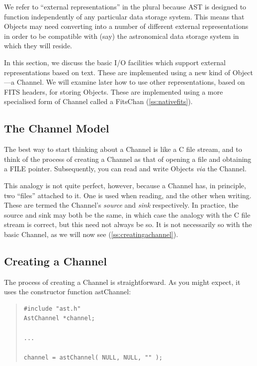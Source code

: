 \documentclass[twoside,11pt]{article}
\newcommand{\htmlref}[2]{#1}
\newcommand{\secref}[1]{\S\ref{#1}}
\renewcommand{\secref}[1]{\ref{#1}}
\begin{document}
We refer to ``external representations'' in the plural because AST is
designed to function independently of any particular data storage
system. This means that Objects may need converting into a number of
different external representations in order to be compatible with
(say) the astronomical data storage system in which they will reside.

In this section, we discuss the basic I/O facilities which support
external representations based on text. These are implemented using a
new kind of Object---a \htmlref{Channel}{Channel}. We will examine later how
to use other representations, based on FITS headers, for storing
Objects. These are implemented using a more specialised form of
Channel called a \htmlref{FitsChan}{FitsChan} (\secref{ss:nativefits}).

\subsection{The Channel Model}

The best way to start thinking about a \htmlref{Channel}{Channel} is like a C file
stream, and to think of the process of creating a Channel as that
of opening a file and obtaining a FILE pointer.  Subsequently, you can
read and write Objects {\em{via}} the Channel.

This analogy is not quite perfect, however, because a Channel has, in
principle, two ``files'' attached to it. One is used when reading, and
the other when writing. These are termed the Channel's {\em{source}}
and {\em{sink}} respectively. In practice, the source and sink may
both be the same, in which case the analogy with the C file stream is
correct, but this need not always be so. It is not necessarily so with
the basic Channel, as we will now see (\secref{ss:creatingachannel}).

\subsection{\label{ss:creatingachannel}Creating a Channel}

The process of creating a \htmlref{Channel}{Channel} is straightforward. As you
might expect, it uses the constructor function \htmlref{astChannel}{astChannel}:

\begin{quote}
\small
\begin{verbatim}
#include "ast.h"
AstChannel *channel;

...

channel = astChannel( NULL, NULL, "" );
\end{verbatim}
\normalsize
\end{quote}
\end{document}
